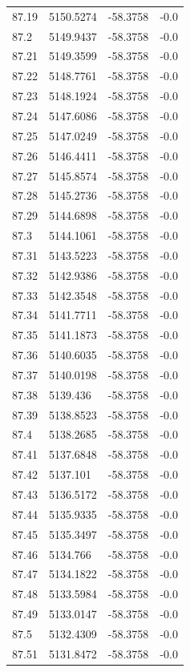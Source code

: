 \begin{table}[H]
\begin{tabular}{llll}
87.19 & 5150.5274 & -58.3758 & -0.0 \\
87.2 & 5149.9437 & -58.3758 & -0.0 \\
87.21 & 5149.3599 & -58.3758 & -0.0 \\
87.22 & 5148.7761 & -58.3758 & -0.0 \\
87.23 & 5148.1924 & -58.3758 & -0.0 \\
87.24 & 5147.6086 & -58.3758 & -0.0 \\
87.25 & 5147.0249 & -58.3758 & -0.0 \\
87.26 & 5146.4411 & -58.3758 & -0.0 \\
87.27 & 5145.8574 & -58.3758 & -0.0 \\
87.28 & 5145.2736 & -58.3758 & -0.0 \\
87.29 & 5144.6898 & -58.3758 & -0.0 \\
87.3 & 5144.1061 & -58.3758 & -0.0 \\
87.31 & 5143.5223 & -58.3758 & -0.0 \\
87.32 & 5142.9386 & -58.3758 & -0.0 \\
87.33 & 5142.3548 & -58.3758 & -0.0 \\
87.34 & 5141.7711 & -58.3758 & -0.0 \\
87.35 & 5141.1873 & -58.3758 & -0.0 \\
87.36 & 5140.6035 & -58.3758 & -0.0 \\
87.37 & 5140.0198 & -58.3758 & -0.0 \\
87.38 & 5139.436 & -58.3758 & -0.0 \\
87.39 & 5138.8523 & -58.3758 & -0.0 \\
87.4 & 5138.2685 & -58.3758 & -0.0 \\
87.41 & 5137.6848 & -58.3758 & -0.0 \\
87.42 & 5137.101 & -58.3758 & -0.0 \\
87.43 & 5136.5172 & -58.3758 & -0.0 \\
87.44 & 5135.9335 & -58.3758 & -0.0 \\
87.45 & 5135.3497 & -58.3758 & -0.0 \\
87.46 & 5134.766 & -58.3758 & -0.0 \\
87.47 & 5134.1822 & -58.3758 & -0.0 \\
87.48 & 5133.5984 & -58.3758 & -0.0 \\
87.49 & 5133.0147 & -58.3758 & -0.0 \\
87.5 & 5132.4309 & -58.3758 & -0.0 \\
87.51 & 5131.8472 & -58.3758 & -0.0 \\

\end{tabular}
\end{table}
